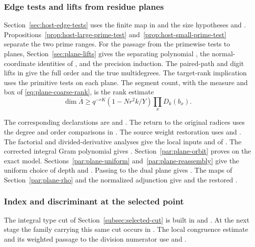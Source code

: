 \subsubsection{Edge tests and lifts from residue planes}
Section~\ref{sec:host-edge-tests} uses the finite map in
 and the size hypotheses  and
. Propositions~\ref{prop:host-large-prime-test}
and~\ref{prop:host-small-prime-test} separate the two prime ranges. For the passage from the primewise tests to planes, Section~\ref{sec:plane-lifts}
gives the separating polynomial
, the normal-coordinate identities of ,
and the precision induction. The paired-path and digit lifts in
 give the full order and the
true multidegrees. The target-rank implication
 uses the primitive tests on each plane.
The segment count, with the measure and box of
\eqref{eq:plane-coarse-rank}, is the rank estimate
\[
 \dim\overline\Lambda\ge q^{-rK}(1-Nr^2 k/Y)\prod_x D_k(b_x).
\]

The corresponding declarations are 
and . The return to the
original radices uses the degree and order comparisons in
.
The source weight restoration uses  and
.
The factorial and divided-derivative analyses give the local
inputs  and  of .
The corrected integral Gram polynomial gives .
Section~\ref{par:plane-orbit} proves  on the exact
model. Sections~\ref{par:plane-uniform} and~\ref{par:plane-reassembly}
give the uniform choice of depth and . Passing to
the dual plane gives . The maps of
Section~\ref{par:plane-rho} and the normalized adjunction give
 and the restored . \cite{release}

\subsubsection{Index and discriminant at the selected point}
The integral type cut of Section~\ref{subsec:selected-cut}
is built in  and .
At the next stage the family carrying this same cut occurs in . The local
congruence estimate and its weighted passage to the
division numerator use 
and . \cite{release}

